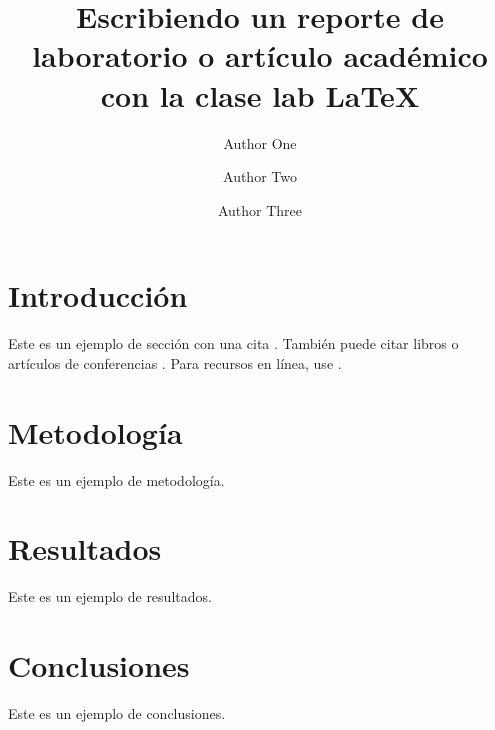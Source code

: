 \documentclass[9pt,a4paper,twocolumn,twoside]{lab-class/lab}
\title{Escribiendo un reporte de laboratorio o artículo académico con la clase lab \LaTeX}
\author[a,1]{Author One}
\author[b,2]{Author Two}
\author[b,c,3]{Author Three}
\affil[a]{Affiliation of author one}
\affil[b]{Affiliation of author two}
\affil[c]{Affiliation of author three}
\begin{document}
    \maketitle 
    \thispagestyle{firststyle} 
    \lababstract 
    

\section{Introducción}
Este es un ejemplo de sección con una cita \cite{example_article}. También puede citar libros \cite{example_book} o artículos de conferencias \cite{example_conference}. Para recursos en línea, use \cite{example_website}.

\section{Metodología}
Este es un ejemplo de metodología.

\section{Resultados}
Este es un ejemplo de resultados.

\section{Conclusiones}
Este es un ejemplo de conclusiones.




\end{document}
